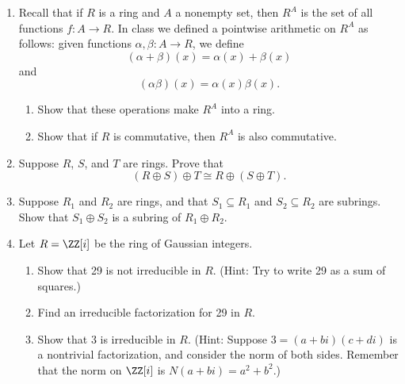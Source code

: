 \documentclass{article}
\begin{document}
\HomeworkTitle[class={Abstract Algebra}, number={2}]

\begin{enumerate}
\item Recall that if $R$ is a ring and $A$ a nonempty set, then $R^A$ is the set of all functions $f : A \rightarrow R$. In class we defined a pointwise arithmetic on $R^A$ as follows: given functions $\alpha, \beta : A \rightarrow R$, we define \[ (\alpha + \beta)(x) = \alpha(x) + \beta(x) \] and \[ (\alpha\beta)(x) = \alpha(x) \beta(x). \]
\begin{enumerate}
\item Show that these operations make $R^A$ into a ring.
\item Show that if $R$ is commutative, then $R^A$ is also commutative.
\end{enumerate}

\item Suppose $R$, $S$, and $T$ are rings. Prove that \[ (R \oplus S) \oplus T \cong R \oplus (S \oplus T). \]

\item Suppose $R_1$ and $R_2$ are rings, and that $S_1 \subseteq R_1$ and $S_2 \subseteq R_2$ are subrings. Show that $S_1 \oplus S_2$ is a subring of $R_1 \oplus R_2$.

\item Let $R = \ZZ[i]$ be the ring of Gaussian integers.
\begin{enumerate}
\item Show that 29 is not irreducible in $R$. (Hint: Try to write 29 as a sum of squares.)
\item Find an irreducible factorization for 29 in $R$.
\item Show that 3 is irreducible in $R$. (Hint: Suppose $3 = (a+bi)(c+di)$ is a nontrivial factorization, and consider the norm of both sides. Remember that the norm on $\ZZ[i]$ is $N(a+bi) = a^2 + b^2$.)
\end{enumerate}
\end{enumerate}
\end{document}
